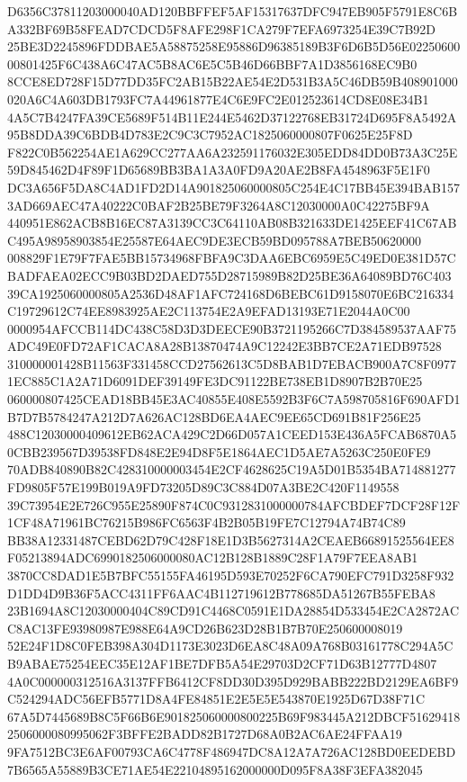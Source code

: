 \documentclass[UTF8,fontset=fandol,zihao=-4,a4paper]{ctexart}
\begin{document}
{{D6356C37811203000040AD120BBFFEF5AF15317637DFC947EB905F5791E8C6BA332BF69B58FEAD7CDCD5F8AFE298F1CA279F7EFA6973254E39C7B92D
25BE3D2245896FDDBAE5A58875258E95886D96385189B3F6D6B5D56E0225060000801425F6C438A6C47AC5B8AC6E5C5B46D66BBF7A1D3856168EC9B0
8CCE8ED728F15D77DD35FC2AB15B22AE54E2D531B3A5C46DB59B408901000020A6C4A603DB1793FC7A44961877E4C6E9FC2E012523614CD8E08E34B1
4A5C7B4247FA39CE5689F514B11E244E5462D37122768EB31724D695F8A5492A95B8DDA39C6BDB4D783E2C9C3C7952AC1825060000807F0625E25F8D
F822C0B562254AE1A629CC277AA6A232591176032E305EDD84DD0B73A3C25E59D845462D4F89F1D65689BB3BA1A3A0FD9A20AE2B8FA4548963F5E1F0
DC3A656F5DA8C4AD1FD2D14A901825060000805C254E4C17BB45E394BAB1573AD669AEC47A40222C0BAF2B25BE79F3264A8C12030000A0C42275BF9A
440951E862ACB8B16EC87A3139CC3C64110AB08B321633DE1425EEF41C67ABC495A98958903854E25587E64AEC9DE3ECB59BD095788A7BEB50620000
008829F1E79F7FAE5BB15734968FBFA9C3DAA6EBC6959E5C49ED0E381D57CBADFAEA02ECC9B03BD2DAED755D28715989B82D25BE36A64089BD76C403
39CA1925060000805A2536D48AF1AFC724168D6BEBC61D9158070E6BC216334C19729612C74EE8983925AE2C113754E2A9EFAD13193E71E2044A0C00
0000954AFCCB114DC438C58D3D3DEECE90B3721195266C7D384589537AAF75ADC49E0FD72AF1CACA8A28B13870474A9C12242E3BB7CE2A71EDB97528
310000001428B11563F331458CCD27562613C5D8BAB1D7EBACB900A7C8F09771EC885C1A2A71D6091DEF39149FE3DC91122BE738EB1D8907B2B70E25
060000807425CEAD18BB45E3AC40855E408E5592B3F6C7A598705816F690AFD1B7D7B5784247A212D7A626AC128BD6EA4AEC9EE65CD691B81F256E25
488C12030000409612EB62ACA429C2D66D057A1CEED153E436A5FCAB6870A50CBB239567D39538FD848E2E94D8F5E1864AEC1D5AE7A5263C250E0FE9
70ADB840890B82C428310000003454E2CF4628625C19A5D01B5354BA714881277FD9805F57E199B019A9FD73205D89C3C884D07A3BE2C420F1149558
39C73954E2E726C955E25890F874C0C9312831000000784AFCBDEF7DCF28F12F1CF48A71961BC76215B986FC6563F4B2B05B19FE7C12794A74B74C89
BB38A12331487CEBD62D79C428F18E1D3B5627314A2CEAEB66891525564EE8F05213894ADC6990182506000080AC12B128B1889C28F1A79F7EEA8AB1
3870CC8DAD1E5B7BFC55155FA46195D593E70252F6CA790EFC791D3258F932D1DD4D9B36F5ACC4311FF6AAC4B112719612B778685DA51267B55FEBA8
23B1694A8C12030000404C89CD91C4468C0591E1DA28854D533454E2CA2872ACC8AC13FE93980987E988E64A9CD26B623D28B1B7B70E250600008019
52E24F1D8C0FEB398A304D1173E3023D6EA8C48A09A768B03161778C294A5CB9ABAE75254EEC35E12AF1BE7DFB5A54E29703D2CF71D63B12777D4807
4A0C000000312516A3137FFB6412CF8DD30D395D929BABB222BD2129EA6BF9C524294ADC56EFB5771D8A4FE84851E2E5E5E543870E1925D67D38F71C
67A5D7445689B8C5F66B6E901825060000800225B69F983445A212DBCF516294182506000080995062F3BFFE2BADD82B1727D68A0B2AC6AE24FFAA19
9FA7512BC3E6AF00793CA6C4778F486947DC8A12A7A726AC128BD0EEDEBD7B6565A55889B3CE71AE54E22104895162000000D095F8A38F3EFA382045
}}
\end{document}

